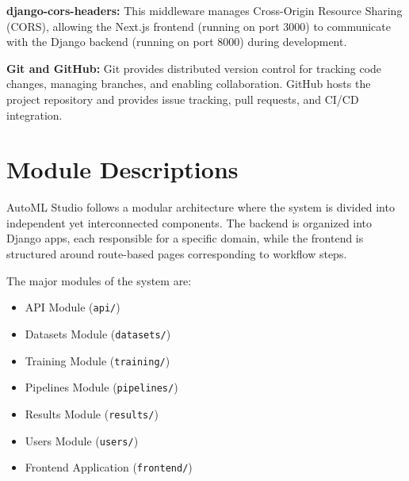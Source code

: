 \documentclass[12pt,a4paper]{report}
\begin{document}
\vspace{0.4cm}

\textbf{django-cors-headers:}
This middleware manages Cross-Origin Resource Sharing (CORS), allowing the Next.js frontend (running on port 3000) to communicate with the Django backend (running on port 8000) during development.

\vspace{0.4cm}

\textbf{Git and GitHub:}
Git provides distributed version control for tracking code changes, managing branches, and enabling collaboration. GitHub hosts the project repository and provides issue tracking, pull requests, and CI/CD integration.


\setcounter{chapter}{4}
\clearpage
\thispagestyle{empty}

\noindent
{}

\clearpage
{}
\setcounter{section}{0}


\section{Module Descriptions}

AutoML Studio follows a modular architecture where the system is divided into independent yet interconnected components. The backend is organized into Django apps, each responsible for a specific domain, while the frontend is structured around route-based pages corresponding to workflow steps.

The major modules of the system are:

\begin{itemize}
    \item API Module (\texttt{api/})
    \item Datasets Module (\texttt{datasets/})
    \item Training Module (\texttt{training/})
    \item Pipelines Module (\texttt{pipelines/})
    \item Results Module (\texttt{results/})
    \item Users Module (\texttt{users/})
    \item Frontend Application (\texttt{frontend/})
\end{itemize}
\end{document}
